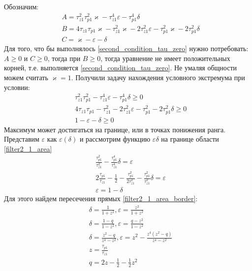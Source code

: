 \documentclass[a4paper,14pt]{extarticle} %
\begin{document}
Обозначим:
 \begin{equation}
 \begin{aligned}
&A = \tau_{z1}^2\tau_{p1}^2\varkappa - \tau_{z1}^4\varepsilon - \tau_{p1}^4\delta\\
&B = 4\tau_{z1}\tau_{p1}\varkappa - \tau_{z1}^2\varkappa - 2\tau_{z1}^2\varepsilon - \tau_{p1}^2\varkappa - 2\tau_{p1}^2\delta\\
&C = \varkappa-\varepsilon - \delta
 \end{aligned}
\end{equation}
Для того, что бы выполнялось \eqref{second_condition_tau_zero} нужно потребовать: $A \geq 0$ и $C \geq 0$, тогда  при $B \geq 0$, тогда уравнение не имеет положительных корней, т.е. выполняется \eqref{second_condition_tau_zero}. Не умаляя общности можем считать $\varkappa = 1$. Получили задачу нахождения условного экстремума при условии:
 \begin{equation}\label{filter2_1_area}
 \begin{aligned}
&\tau_{z1}^2\tau_{p1}^2 - \tau_{z1}^4\varepsilon - \tau_{p1}^4\delta \geq 0\\
&4\tau_{z1}\tau_{p1} - \tau_{z1}^2 - 2\tau_{z1}^2\varepsilon - \tau_{p1}^2 - 2\tau_{p1}^2\delta \geq 0\\
&1-\varepsilon - \delta \geq 0
 \end{aligned}
\end{equation}
Максимум может достигаться на границе, или в точках понижения ранга. Представим $\varepsilon$ как $\varepsilon(\delta)$ и рассмотрим функцию $\varepsilon\delta$ на границе области \eqref{filter2_1_area}
 \begin{equation}\label{filter2_1_area_border}
 \begin{aligned}
&\frac{\tau_{p1}^2}{\tau_{z1}^2} - \frac{\tau_{p1}^4}{\tau_{z1}^4}\delta =\varepsilon\\
&2\frac{\tau_{p1}}{\tau_{z1}} - \frac{1}{2} - \frac{\tau_{p1}^2}{2\tau_{z1}^2} - \frac{\tau_{p1}^2}{\tau_{z1}^2}\delta =  \varepsilon\\
&\varepsilon = 1 - \delta
 \end{aligned}
\end{equation}
 Для этого найдем пересечения прямых \eqref{filter2_1_area_border}:
  \begin{equation}
 \begin{aligned}
&\delta = \frac{1}{1+z^2}, \varepsilon = \frac{z^2}{1+z^2}\\
&\delta = \frac{1-q}{1-z^2}, \varepsilon = \frac{q-z^2}{1-z^2}\\
&\delta = \frac{z^2-q}{z^4-z^2}, \varepsilon = z^2 - \frac{z^4(z^2-q)}{z^4-z^2}\\
&z = \frac{\tau_{p1}}{\tau_{z1}}\\
&q = 2z - \frac{1}{2} - \frac{1}{2}z^2\\
 \end{aligned}
\end{equation}
\end{document}
